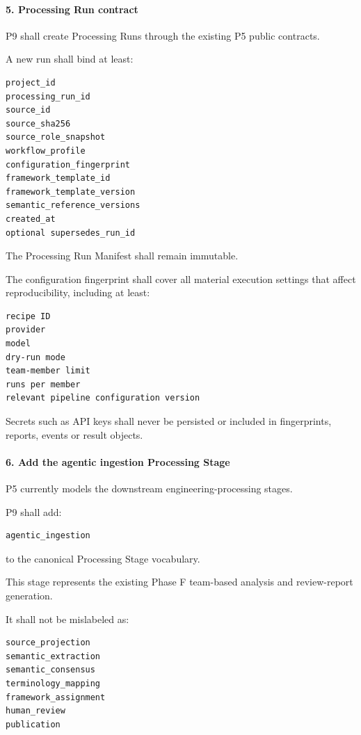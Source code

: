 \hypertarget{5-processing-run-contract}{%
\paragraph{5. Processing Run contract}\label{5-processing-run-contract}}

P9 shall create Processing Runs through the existing P5 public contracts.

A new run shall bind at least:

\begin{verbatim}
project_id
processing_run_id
source_id
source_sha256
source_role_snapshot
workflow_profile
configuration_fingerprint
framework_template_id
framework_template_version
semantic_reference_versions
created_at
optional supersedes_run_id
\end{verbatim}

The Processing Run Manifest shall remain immutable.

The configuration fingerprint shall cover all material execution settings that affect reproducibility, including at least:

\begin{verbatim}
recipe ID
provider
model
dry-run mode
team-member limit
runs per member
relevant pipeline configuration version
\end{verbatim}

Secrets such as API keys shall never be persisted or included in fingerprints, reports, events or result objects.

\hypertarget{6-add-the-agentic-ingestion-processing-stage}{%
\paragraph{6. Add the agentic ingestion Processing Stage}\label{6-add-the-agentic-ingestion-processing-stage}}

P5 currently models the downstream engineering-processing stages.

P9 shall add:

\begin{verbatim}
agentic_ingestion
\end{verbatim}

to the canonical Processing Stage vocabulary.

This stage represents the existing Phase F team-based analysis and review-report generation.

It shall not be mislabeled as:

\begin{verbatim}
source_projection
semantic_extraction
semantic_consensus
terminology_mapping
framework_assignment
human_review
publication
\end{verbatim}

